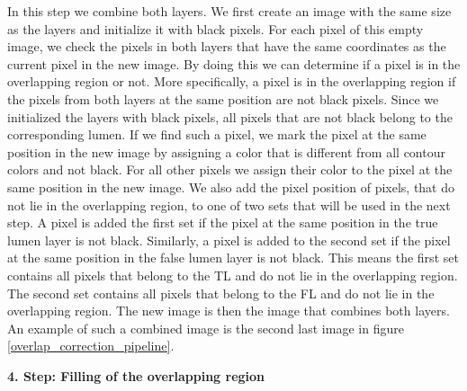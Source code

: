 \documentclass[thesis.tex]{subfiles}
\begin{document}
In this step we combine both layers. We first create an image with the same size as the layers and initialize it with black pixels. For each pixel of this empty image, we check the pixels in both layers that have the same coordinates as the current pixel in the new image. By doing this we can determine if a pixel is in the overlapping region or not. More specifically, a pixel is in the overlapping region if the pixels from both layers at the same position are not black pixels. Since we initialized the layers with black pixels, all pixels that are not black belong to the corresponding lumen. If we find such a pixel, we mark the pixel at the same position in the new image by assigning a color that is different from all contour colors and not black. For all other pixels we assign their color to the pixel at the same position in the new image. We also add the pixel position of pixels, that do not lie in the overlapping region, to one of two sets that will be used in the next step. A pixel is added the first set if the pixel at the same position in the true lumen layer is not black. Similarly, a pixel is added to the second set if the pixel at the same position in the false lumen layer is not black. This means the first set contains all pixels that belong to the TL and do not lie in the overlapping region. The second set contains all pixels that belong to the FL and do not lie in the overlapping region. The new image is then the image that combines both layers. An example of such a combined image is the second last image in figure \ref{overlap_correction_pipeline}.

\textbf{4. Step: Filling of the overlapping region}
\end{document}
